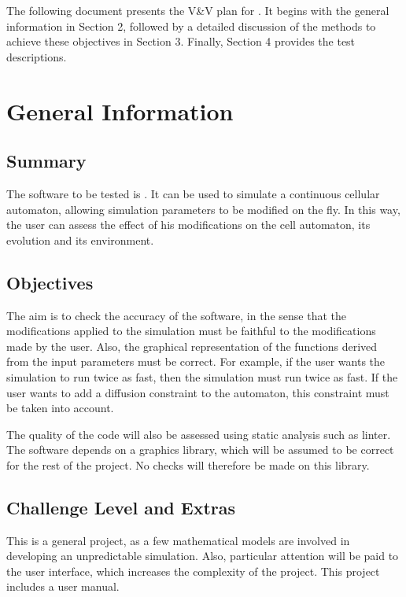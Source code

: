 \documentclass[12pt, titlepage]{article}
\begin{document}
The following document presents the V\&V plan for \progname. It begins with the general information in Section 2, followed by a detailed discussion of the methods to achieve these objectives in Section 3. Finally, Section 4 provides the test descriptions.

\section{General Information}

\subsection{Summary}

The software to be tested is \progname. It can be used to simulate a continuous cellular automaton, allowing simulation parameters to be modified on the fly. 
In this way, the user can assess the effect of his modifications on the cell automaton, its evolution and its environment.

\subsection{Objectives}

The aim is to check the accuracy of the software, in the sense that the modifications applied to the simulation must be faithful to the modifications made by the user. 
Also, the graphical representation of the functions derived from the input parameters must be correct. 
For example, if the user wants the simulation to run twice as fast, then the simulation must run twice as fast.
If the user wants to add a diffusion constraint to the automaton, this constraint must be taken into account.

The quality of the code will also be assessed using static analysis such as linter.
The software depends on a graphics library, which will be assumed to be correct for the rest of the project. No checks will therefore be made on this library.

\subsection{Challenge Level and Extras}

This is a general project, as a few mathematical models are involved in developing an unpredictable simulation.
Also, particular attention will be paid to the user interface, which increases the complexity of the project.
This project includes a user manual.
\end{document}
